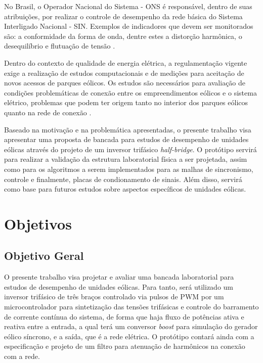 No Brasil, o Operador Nacional do Sistema - ONS é responsável, dentro de suas atribuições, por realizar o controle de desempenho da rede básica do Sistema Interligado Nacional - SIN. 
Exemplos de indicadores que devem ser monitorados são: a conformidade da forma de onda, dentre estes a distorção harmônica, o desequilíbrio e flutuação de tensão \cite{DissertacaoLeandro}.

Dentro do contexto de qualidade de energia elétrica, a regulamentação vigente exige a realização de estudos computacionais e de medições para aceitação de novos acessos de parques eólicos. 
Os estudos são necessários para avaliação de condições problemáticas de conexão entre os empreendimentos eólicos e o sistema elétrico, problemas que podem ter origem tanto no interior dos parques eólicos quanto na rede de conexão \cite{DissertacaoLeandro}.

Baseado na motivação e na problemática apresentadas, o presente trabalho visa apresentar uma proposta de bancada para estudos de desempenho de unidades eólicas através do projeto de um inversor trifásico \textit{half-bridge}.
O protótipo servirá para realizar a validação da estrutura laboratorial física a ser projetada, assim como para os algoritmos a serem implementados para as malhas de sincronismo, controle e finalmente, placas de condionamento de sinais.
Além disso, servirá como base para futuros estudos sobre aspectos específicos de unidades eólicas.

\section{Objetivos}

\subsection{Objetivo Geral}
O presente trabalho visa projetar e avaliar uma bancada laboratorial para estudos de desempenho de unidades eólicas.
Para tanto, será utilizado um inversor trifásico de três braços controlado via pulsos de PWM por um microcontrolador
para sintetização das tensões trifásicas e controle do barramento de corrente contínua do sistema, de forma que haja fluxo
de potências ativa e reativa entre a entrada, a qual terá um conversor \textit{boost} para simulação do gerador eólico síncrono, e a saída, que é a rede elétrica.
O protótipo contará ainda com a especificação e projeto de um filtro para atenuação de harmônicos na conexão com a rede.

